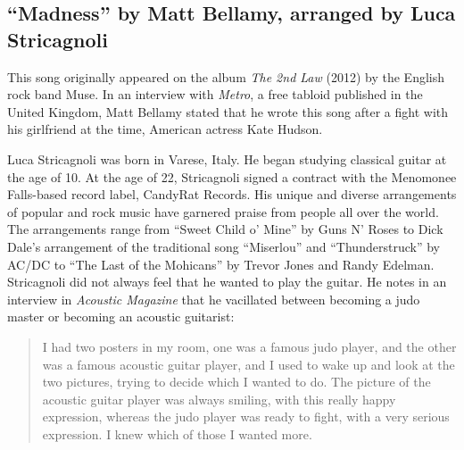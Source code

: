 \documentclass{tufte-handout}
\newcommand{\textls}[2][5]{%
    \begingroup\addfontfeatures{LetterSpace=#1}#2\endgroup
  }
\renewcommand{\smallcapsspacing}[1]{\textls[10]{#1}}
\renewcommand{\textsc}[1]{\smallcapsspacing{\textsmallcaps{#1}}}
\begin{document}

\subsection*{``Madness'' by Matt Bellamy, arranged by Luca Stricagnoli}
This song originally appeared on the album \emph{The 2nd Law} (2012) by the English
rock band Muse. In an interview with \emph{Metro}, a free tabloid published in
the United Kingdom, Matt Bellamy stated that he wrote this song after a fight
with his girlfriend at the time, American actress Kate Hudson.

Luca Stricagnoli was born in Varese, Italy. He began studying classical guitar
at the age of 10. At the age of 22, Stricagnoli signed a contract with the
Menomonee Falls-based record label, CandyRat Records. His unique and diverse
arrangements of popular and rock music have garnered praise from people all
over the world. The arrangements range from ``Sweet Child o' Mine'' by Guns N'
Roses to Dick Dale's arrangement of the traditional song ``Miserlou'' and
``Thunderstruck'' by AC/DC to ``The Last of the Mohicans'' by Trevor Jones and
Randy Edelman. Stricagnoli did not always feel that he wanted to play the
guitar. He notes in an interview in \emph{Acoustic Magazine} that he
vacillated between becoming a judo master or becoming an acoustic guitarist:
\begin{quote}
  I had two posters in my room, one was a famous judo player, and the other
  was a famous acoustic guitar player, and I used to wake up and look at the
  two pictures, trying to decide which I wanted to do. The picture of the
  acoustic guitar player was always smiling, with this really happy
  expression, whereas the judo player was ready to fight, with a very serious
  expression. I knew which of those I wanted more.
\end{quote}
\end{document}
